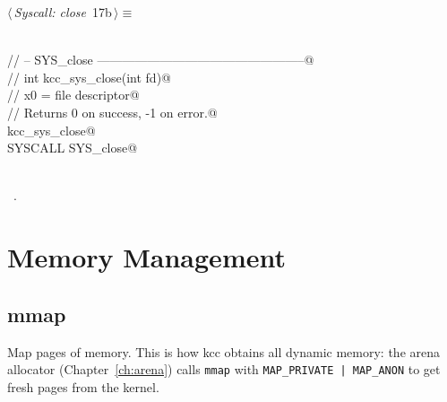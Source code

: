 \documentclass[11pt,a4paper,twoside,openright,DIV=15]{scrbook}
\theoremstyle{definition}
\theoremstyle{plain}
\theoremstyle{remark}
\newcommand{\kcc}{\textsf{kcc}}
\begin{document}
\begin{flushleft} \small
\begin{minipage}{\linewidth}\label{scrap7}\raggedright\small
{} $\langle\,${\itshape Syscall: close}\nobreak\ {\footnotesize {17b}}$\,\rangle\equiv$
\vspace{-1ex}
\begin{list}{}{} \item
\mbox{}\verb@@\\
\mbox{}\verb@// -- SYS_close --------------------------------------------------@\\
\mbox{}\verb@// int kcc_sys_close(int fd)@\\
\mbox{}\verb@//   x0 = file descriptor@\\
\mbox{}\verb@// Returns 0 on success, -1 on error.@\\
\mbox{}\verb@FUNC kcc_sys_close@\\
\mbox{}\verb@    SYSCALL SYS_close@\\
\mbox{}\verb@ENDFUNC@\\
\mbox{}\verb@@{\NWsep}
\end{list}
\vspace{-1.5ex}
\footnotesize
\begin{list}{}{\setlength{\itemsep}{-\parsep}\setlength{\itemindent}{-\leftmargin}}
\item \NWtxtMacroRefIn\ .

\item{}
\end{list}
\end{minipage}\vspace{4ex}
\end{flushleft}
\section{Memory Management}

\subsection{mmap}

Map pages of memory.  This is how \kcc{} obtains all dynamic memory:
the arena allocator (Chapter~\ref{ch:arena}) calls \texttt{mmap}
with \texttt{MAP\_PRIVATE | MAP\_ANON} to get fresh pages from the
kernel.
\end{document}
